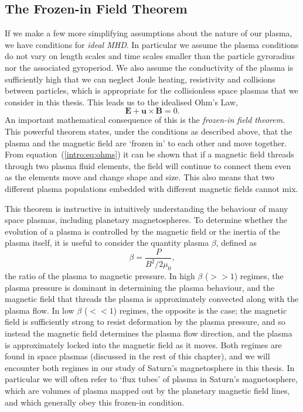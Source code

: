 \subsection{The Frozen-in Field Theorem}\label{intro:sec:frozenin}
If we make a few more simplifying assumptions about the nature of our plasma, we have conditions for \textit{ideal MHD}. In particular we assume the plasma conditions do not vary on length scales and time scales smaller than the particle gyroradius nor the associated gyroperiod. We also assume the conductivity of the plasma is sufficiently high that we can neglect Joule heating, resistivity and collisions between particles, which is appropriate for the collisionless space plasmas that we consider in this thesis. This leads us to the idealised Ohm's Law,
\begin{equation}\label{intro:eq:ohms}
\boldsymbol{E} + \boldsymbol{u} \times \boldsymbol{B} = 0.
\end{equation}
An important mathematical consequence of this is the \textit{frozen-in field theorem}. This powerful theorem states, under the conditions as described above, that the plasma and the magnetic field are `frozen in' to each other and move together. From equation~(\ref{intro:eq:ohms}) it can be shown that if a magnetic field threads through two plasma fluid elements, the field will continue to connect them even as the elements move and change shape and size. This also means that two different plasma populations embedded with different magnetic fields cannot mix.

This theorem is instructive in intuitively understanding the behaviour of many space plasmas, including planetary magnetospheres. To determine whether the evolution of a plasma is controlled by the magnetic field or the inertia of the plasma itself, it is useful to consider the quantity plasma $\beta$, defined as
\begin{equation}
\beta = \frac{P}{B^2/2\mu_0},
\end{equation}
the ratio of the plasma to magnetic pressure. In high $\beta$ ($>>1$) regimes, the plasma pressure is dominant in determining the plasma behaviour, and the magnetic field that threads the plasma is approximately convected along with the plasma flow. In low $\beta$ ($<<1$) regimes, the opposite is the case; the magnetic field is sufficiently strong to resist deformation by the plasma pressure, and so instead the magnetic field determines the plasma flow direction, and the plasma is approximately locked into the magnetic field as it moves. Both regimes are found in space plasmas (discussed in the rest of this chapter), and we will encounter both regimes in our study of Saturn's magnetosphere in this thesis. In particular we will often refer to `flux tubes' of plasma in Saturn's magnetosphere, which are volumes of plasma mapped out by the planetary magnetic field lines, and which generally obey this frozen-in condition.

